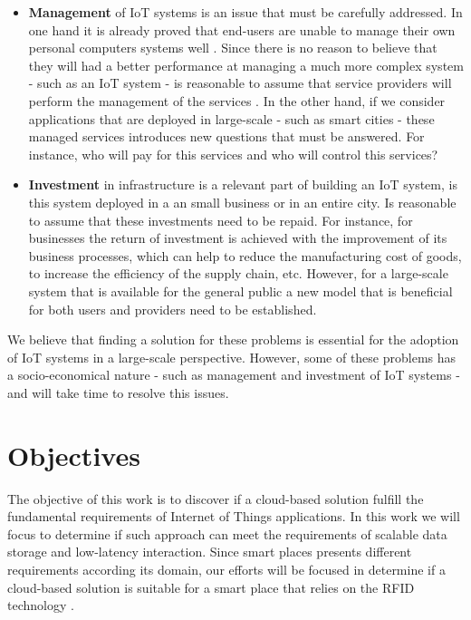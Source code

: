 \begin{itemize}
  \item \textbf{Management} of IoT systems is an issue that must be carefully addressed. In one hand
  it is already proved that end-users are unable to manage their own personal computers systems well
  \cite{doll1988measurement}. Since there is no reason to believe that they will had a better
  performance at managing a much more complex system - such as an \gls{IoT} system - is reasonable to
  assume that service providers will perform the management of the services . In the other hand, if we
  consider applications that are deployed in large-scale - such as smart cities - these managed
  services introduces new questions that must be answered. For instance, who will pay for this
  services and who will control this services?
  \item \textbf{Investment} in infrastructure is a relevant part of building an \gls{IoT} system,
  is this system deployed in a an small business or in an entire city. Is reasonable to assume that
  these investments need to be repaid. For instance, for businesses the return of investment is
  achieved with the improvement of its business processes, which can help to reduce the manufacturing
  cost of goods, to increase the efficiency of the supply chain, etc. However, for a large-scale
  system that is available for the general public a new model that is beneficial for both users and
  providers need to be established.
\end{itemize}

We believe that finding a solution for these problems is essential for the adoption of \gls{IoT} systems
in a large-scale perspective. However, some of these problems has a socio-economical nature - such as
management and investment of \gls{IoT} systems - and will take time to resolve this issues.

\section{Objectives}
\label{section:objectives}
The objective of this work is to discover if a cloud-based solution fulfill the fundamental requirements
of Internet of Things applications. In this work we will focus to determine if such approach can meet
the requirements of scalable data storage and low-latency interaction. Since smart places presents
different requirements according its domain, our efforts will be focused in determine if a cloud-based
solution is suitable for a smart place that relies on the RFID technology \cite{want2006introduction}.\\


